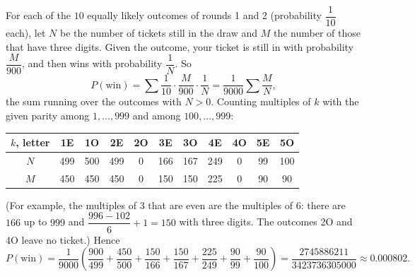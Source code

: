 For each of the $10$ equally likely outcomes of rounds 1 and 2 (probability $\dfrac1{10}$ each), let $N$ be the number of tickets still in the draw and $M$ the number of those that have three digits. Given the outcome, your ticket is still in with probability $\dfrac{M}{900}$, and then wins with probability $\dfrac1N$. So
\[P(\text{win})=\sum\dfrac1{10}\cdot\dfrac{M}{900}\cdot\dfrac1N=\dfrac{1}{9000}\sum\dfrac MN,\]
the sum running over the outcomes with $N>0$. Counting multiples of $k$ with the given parity among $1,\dots,999$ and among $100,\dots,999$:
\begin{center}
\begin{tabular}{c|cccccccccc}
$k$, letter & 1E & 1O & 2E & 2O & 3E & 3O & 4E & 4O & 5E & 5O\\
\hline
$N$ & 499 & 500 & 499 & 0 & 166 & 167 & 249 & 0 & 99 & 100\\
$M$ & 450 & 450 & 450 & 0 & 150 & 150 & 225 & 0 & 90 & 90
\end{tabular}
\end{center}
(For example, the multiples of $3$ that are even are the multiples of $6$: there are $166$ up to $999$ and $\dfrac{996-102}{6}+1=150$ with three digits. The outcomes 2O and 4O leave no ticket.) Hence
\[P(\text{win})=\dfrac1{9000}\left(\dfrac{900}{499}+\dfrac{450}{500}+\dfrac{150}{166}+\dfrac{150}{167}+\dfrac{225}{249}+\dfrac{90}{99}+\dfrac{90}{100}\right)=\boxed{\dfrac{2745886211}{3423736305000}}\approx0.000802.\]
